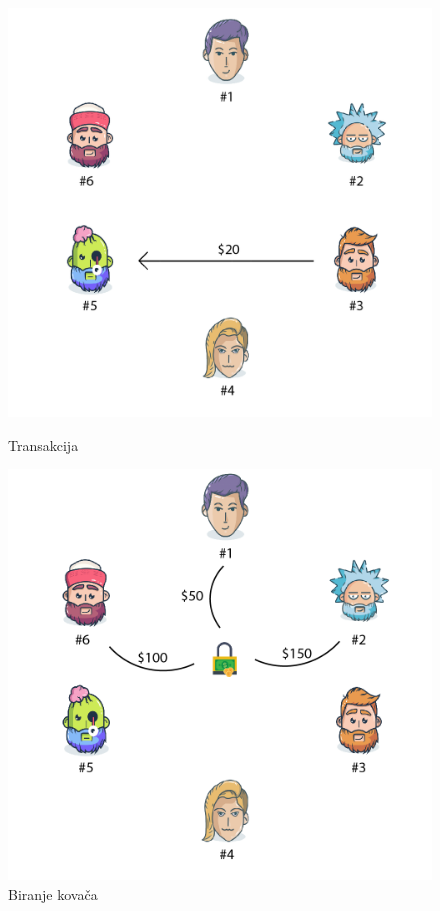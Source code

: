 \documentclass[times, utf8, zavrsni, numeric]{fer}
\begin{document}
\begin{figure}[ht]
  \centering
  \begin{minipage}[b]{0.49\textwidth}
    \includegraphics[width=\textwidth]{pos1.png}
    \caption{Transakcija}
  \end{minipage}
  \hfill
  \begin{minipage}[b]{0.5\textwidth}
    \includegraphics[width=\textwidth]{pos2.png}
    \caption{Biranje kovača}
  \end{minipage}
\end{figure}
\end{document}
